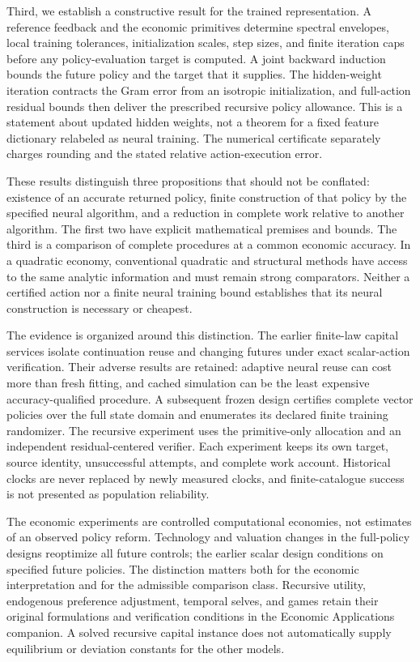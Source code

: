 Third, we establish a constructive result for the trained representation.
A reference feedback and the economic primitives determine spectral envelopes,
local training tolerances, initialization scales, step sizes, and finite
iteration caps before any policy-evaluation target is computed. A joint
backward induction bounds the future policy and the target that it supplies.
The hidden-weight iteration contracts the Gram error from an isotropic
initialization, and full-action residual bounds then deliver the prescribed
recursive policy allowance. This is a statement about updated hidden
weights, not a theorem for a fixed feature dictionary relabeled as neural
training. The numerical certificate separately charges rounding and the
stated relative action-execution error.

These results distinguish three propositions that should not be conflated:
existence of an accurate returned policy, finite construction of that policy
by the specified neural algorithm, and a reduction in complete work relative
to another algorithm. The first two have explicit mathematical premises and
bounds. The third is a comparison of complete procedures at a common economic
accuracy. In a quadratic economy, conventional quadratic and structural
methods have access to the same analytic information and must remain strong
comparators. Neither a certified action nor a finite neural training bound
establishes that its neural construction is necessary or cheapest.

The evidence is organized around this distinction. The earlier finite-law
capital services isolate continuation reuse and changing futures under exact
scalar-action verification. Their adverse results are retained: adaptive
neural reuse can cost more than fresh fitting, and cached simulation can be
the least expensive accuracy-qualified procedure. A subsequent frozen design
certifies complete vector policies over the full state domain and enumerates
its declared finite training randomizer. The recursive experiment uses the
primitive-only allocation and an independent residual-centered verifier. Each
experiment keeps its own target, source identity, unsuccessful attempts,
and complete work account. Historical clocks are never replaced by newly
measured clocks, and finite-catalogue success is not presented as population
reliability.

The economic experiments are controlled computational economies, not estimates
of an observed policy reform. Technology and valuation changes in the
full-policy designs reoptimize all future controls; the earlier scalar design
conditions on specified future policies. The distinction matters both for
the economic interpretation and for the admissible comparison class.
Recursive utility, endogenous preference adjustment, temporal selves, and
games retain their original formulations and verification conditions in the
Economic Applications companion. A solved recursive capital instance does
not automatically supply equilibrium or deviation constants for the other
models.

